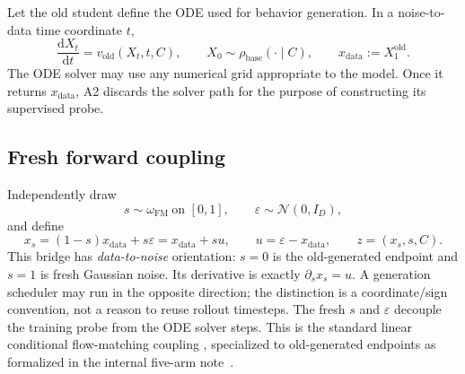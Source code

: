 \documentclass[11pt,a4paper]{article}
\newcommand{\N}{\mathcal{N}}
\newcommand{\old}{\mathrm{old}}
\newcommand{\data}{\mathrm{data}}
\theoremstyle{plain}
\theoremstyle{definition}
\begin{document}
Let the old student define the ODE used for behavior generation.  In a noise-to-data time
coordinate $t$,
\begin{equation}
\frac{\mathrm d X_t}{\mathrm d t}=v_{\old}(X_t,t,C),
\qquad X_0\sim\rho_{\mathrm{base}}(\cdot\mid C),
\qquad x_{\data}:=X_1^{\old}.
\label{eq:behavior-ode}
\end{equation}
The ODE solver may use any numerical grid appropriate to the model.  Once it returns
$x_{\data}$, A2 discards the solver path for the purpose of constructing its supervised probe.

\subsection{Fresh forward coupling}

Independently draw
\begin{equation}
s\sim\omega_{\mathrm{FM}}\ \text{on }[0,1],
\qquad
\varepsilon\sim\N(0,I_D),
\label{eq:fresh-draws}
\end{equation}
and define
\begin{equation}
x_s=(1-s)x_{\data}+s\varepsilon=x_{\data}+su,
\qquad
u=\varepsilon-x_{\data},
\qquad
z=(x_s,s,C).
\label{eq:forward-path}
\end{equation}
This bridge has \emph{data-to-noise} orientation: $s=0$ is the old-generated endpoint and $s=1$
is fresh Gaussian noise.  Its derivative is exactly $\partial_s x_s=u$.  A generation scheduler
may run in the opposite direction; the distinction is a coordinate/sign convention, not a reason
to reuse rollout timesteps.  The fresh $s$ and $\varepsilon$ decouple the training probe from the
ODE solver steps.  This is the standard linear conditional flow-matching coupling
\cite{flowmatching}, specialized to old-generated endpoints as formalized in the internal
five-arm note~\cite{internal-five-arm}.
\end{document}
